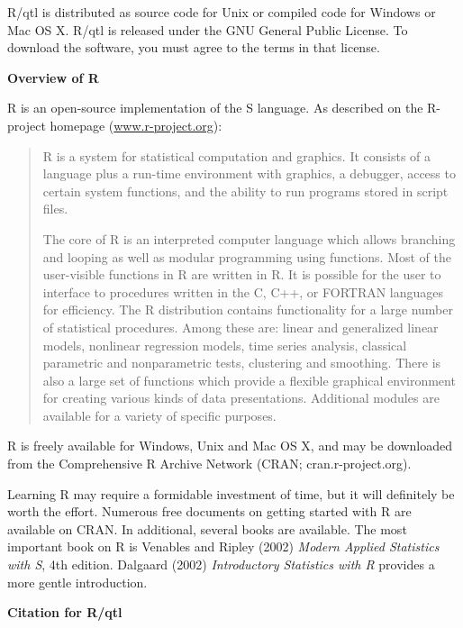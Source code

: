 \documentclass[10pt,letterpaper]{article}
\begin{document}
R/qtl is distributed as source code for Unix or compiled code for
Windows or Mac OS X.  R/qtl is released under the GNU General Public
License. To download the software, you must agree to the terms in that
license.


\vspace{12pt}
\noindent \textbf{Overview of R} \vspace{6pt}

R is an open-source implementation of the S language. As described on
the R-project homepage
(\href{http://www.r-project.org}{www.r-project.org}):

\begin{quote}
R is a system for statistical computation and graphics.  It consists
of a language plus a run-time environment with graphics, a debugger,
access to certain system functions, and the ability to run programs
stored in script files.

The core of R is an interpreted computer language which allows
branching and looping as well as modular programming using
functions. Most of the user-visible functions in R are written in
R. It is possible for the user to interface to procedures written in
the C, C++, or FORTRAN languages for efficiency. The R distribution
contains functionality for a large number of statistical
procedures. Among these are: linear and generalized linear models,
nonlinear regression models, time series analysis, classical
parametric and nonparametric tests, clustering and smoothing. There is
also a large set of functions which provide a flexible graphical
environment for creating various kinds of data
presentations. Additional modules are available for a variety of
specific purposes.
\end{quote} 

R is freely available for Windows, Unix and Mac OS X, and may be
downloaded from the Comprehensive R Archive Network (CRAN;
cran.r-project.org).

Learning R may require a formidable investment of time, but it will
definitely be worth the effort. Numerous free documents on getting
started with R are available on CRAN. In additional, several books are
available.  The most important book on R is Venables and Ripley (2002)
\emph{Modern Applied Statistics with S}, 4th
edition. Dalgaard (2002) \emph{Introductory Statistics with
  R} provides a more gentle introduction.


\vspace{12pt}
\noindent \textbf{Citation for R/qtl} \vspace{6pt}
\end{document}
